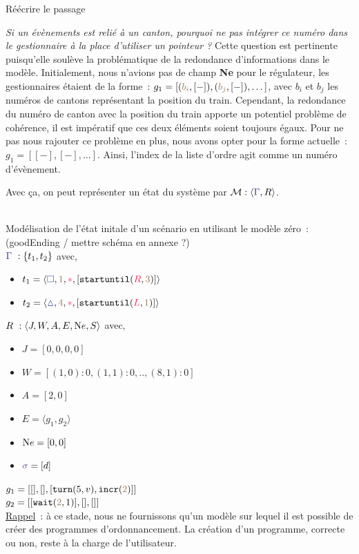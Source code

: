 \documentclass[oneside, a4paper, 11pt]{book}
\newcommand{\trainFmt}[1]{{\color{traincolor} #1}}
\newcommand{\trainTuple}[4]{\langle \trainFmt{#1}, \posFmt{#2}, \dirFmt{#3}, #4 \rangle}
\newcommand{\dirFmt}[1]{{\color{dircolor} #1}}
\newcommand{\posFmt}[1]{{\color{poscolor}{#1}}}
\newcommand{\su}[2]{{\mbox{$\mathtt{startuntil}(\dirFmt{#1}, \posFmt{#2})$}}}
\newcommand{\incr}[1]{{\mbox{\ensuremath{\mathtt{incr}(\posFmt{#1})}}}}
\newcommand{\turnOrder}[2]{{\mbox{\ensuremath{\mathtt{turn}(#1, #2)}}}}
\newcommand{\wait}[2]{{\mbox{\ensuremath{\mathtt{wait}(\posFmt{#1}, #2)}}}}
\newcommand{\swFmt}[1]{{\color{swcolor}{#1}}}
\begin{document}
\begin{sidebox}
	Réécrire le passage 

	\textit{Si un évènements est relié à un canton, pourquoi ne pas intégrer ce numéro dans le gestionnaire à la place d'utiliser un pointeur ?}
	Cette question est pertinente puisqu'elle soulève la problématique de la redondance d'informations dans le modèle. Initialement, nous n'avions pas de champ \textbf{Ne} pour le régulateur, les gestionnaires étaient de la forme~: $g_1 = [(\posFmt{b_i},[-]), (\posFmt{b_j},[-]),\dots]$, avec $b_i$ et $b_j$ les numéros de cantons représentant la position du train.
	Cependant, la redondance du numéro de canton avec la position du train apporte un potentiel problème de cohérence, il est impératif que ces deux éléments soient toujours égaux.
	Pour ne pas nous rajouter ce problème en plus, nous avons opter pour la forme actuelle~: $g_1 = [[-],[-],\dots]$. Ainsi, l'index de la liste d'ordre agit comme un numéro d'évènement.
\end{sidebox}


\noindent
Avec ça, on peut représenter un état du système par $\mathcal{M} : \langle \trainFmt{\Gamma}, R \rangle$.

\begin{example}[GoodEnding M0]
	~\\
	Modélisation de l'état initale d'un scénario en utilisant le modèle zéro~: (goodEnding / mettre schéma en annexe ?)
	\\$\trainFmt{\Gamma}~: \{t_1, t_2\}$ avec,
	\begin{itemize}
		\item[] $t_1 = \trainTuple{\square}{1}{*}{[\su{R}{3}]}$
		\item[] $t_2 = \trainTuple{\vartriangle}{4}{*}{[\su{L}{1}]}$
	\end{itemize}
	\vspace{0.3cm}
	$R~: \langle J,W,A,E,{\text Ne},S \rangle$ avec,	
	\begin{itemize}
		\item[] $J = [0,0,0,0]$
		\item[] $W = [(1,0) : 0, (1,1) : 0, .., (8,1) : 0]$
		\item[] $A = [2,0]$
		\item[] $E = \langle g_1, g_2 \rangle$
		\item[] ${\text Ne} = [0, 0]$
		\item[] $\swFmt{\sigma} = [d]$
	\end{itemize}
	\vspace{0.3cm}
	$g_1 = [[],[],[\turnOrder{5}{v}, \incr{2}]]$
	\\$g_2 = [[\wait{2}{1}],[],[]]$
	\vspace{0.5cm}\\
	\underline{Rappel}~: à ce stade, nous ne fournissons qu'un modèle sur lequel il est possible de créer des programmes d'ordonnancement. La création d'un programme, correcte ou non, reste à la charge de l'utilisateur.
\end{example}
\end{document}
